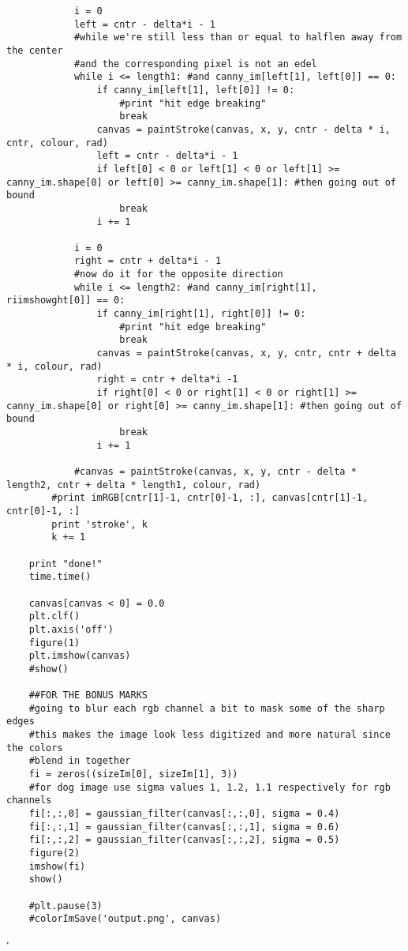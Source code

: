 \documentclass{article}
\begin{document}
\begin{lstlisting}
            i = 0
            left = cntr - delta*i - 1
            #while we're still less than or equal to halflen away from the center
            #and the corresponding pixel is not an edel
            while i <= length1: #and canny_im[left[1], left[0]] == 0:
                if canny_im[left[1], left[0]] != 0:
                    #print "hit edge breaking"
                    break
                canvas = paintStroke(canvas, x, y, cntr - delta * i, cntr, colour, rad)                
                left = cntr - delta*i - 1
                if left[0] < 0 or left[1] < 0 or left[1] >= canny_im.shape[0] or left[0] >= canny_im.shape[1]: #then going out of bound
                    break
                i += 1            
                
            i = 0
            right = cntr + delta*i - 1
            #now do it for the opposite direction
            while i <= length2: #and canny_im[right[1], riimshowght[0]] == 0:
                if canny_im[right[1], right[0]] != 0:
                    #print "hit edge breaking"
                    break                    
                canvas = paintStroke(canvas, x, y, cntr, cntr + delta * i, colour, rad)
                right = cntr + delta*i -1
                if right[0] < 0 or right[1] < 0 or right[1] >= canny_im.shape[0] or right[0] >= canny_im.shape[1]: #then going out of bound
                    break
                i += 1

            #canvas = paintStroke(canvas, x, y, cntr - delta * length2, cntr + delta * length1, colour, rad)
        #print imRGB[cntr[1]-1, cntr[0]-1, :], canvas[cntr[1]-1, cntr[0]-1, :]
        print 'stroke', k
        k += 1
        
    print "done!"
    time.time()
    
    canvas[canvas < 0] = 0.0
    plt.clf()
    plt.axis('off')
    figure(1)
    plt.imshow(canvas)
    #show()
    
    ##FOR THE BONUS MARKS
    #going to blur each rgb channel a bit to mask some of the sharp edges
    #this makes the image look less digitized and more natural since the colors
    #blend in together
    fi = zeros((sizeIm[0], sizeIm[1], 3))
    #for dog image use sigma values 1, 1.2, 1.1 respectively for rgb channels
    fi[:,:,0] = gaussian_filter(canvas[:,:,0], sigma = 0.4)
    fi[:,:,1] = gaussian_filter(canvas[:,:,1], sigma = 0.6)
    fi[:,:,2] = gaussian_filter(canvas[:,:,2], sigma = 0.5)
    figure(2)
    imshow(fi)
    show()
    
    #plt.pause(3)
    #colorImSave('output.png', canvas)

\end{lstlisting}`
\end{document}

